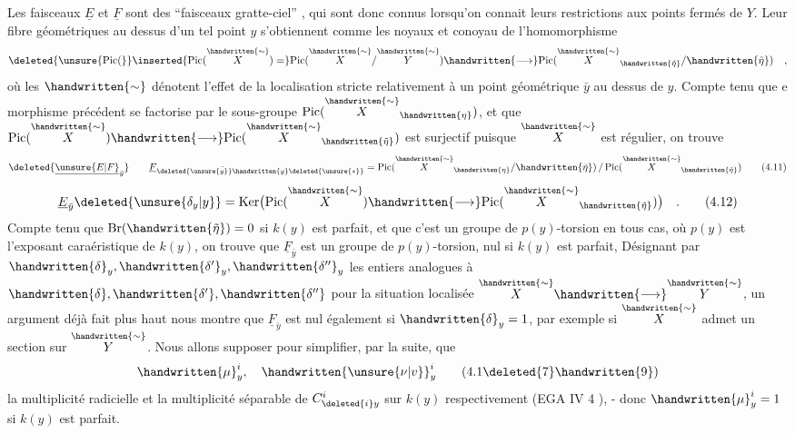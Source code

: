 Les faisceaux $\underline E$ et $\underline F$ sont des ``faisceaux gratte-ciel'' , qui sont donc connus lorsqu'on connait leurs restrictions aux points fermés de $Y$. Leur fibre géométriques au dessus d'un tel point $y$ s'obtiennent comme les noyaux et conoyau de l'homomorphisme
\[
  \deleted{\unsure{\mathrm{Pic}(}}\inserted{\mathrm{Pic}(\overset{\handwritten{\sim}}{X})=}
  \mathrm{Pic}(\overset{\handwritten{\sim}}{X}/\overset{\handwritten{\sim}}{Y})\handwritten{\longrightarrow}
  \mathrm{Pic}(\overset{\handwritten{\sim}}{X}_{\handwritten{\tilde\eta}}/\handwritten{\tilde\eta})\quad ,
\]
où les $\handwritten{\sim}$ dénotent l'effet de la localisation stricte relativement à un point géométrique $\bar y$ au dessus de $y$.  Compte tenu que e morphisme précédent se factorise par le sous-groupe $\mathrm{Pic}(\overset{\handwritten{\sim}}{X}_{\handwritten{\eta}})$, et que $\mathrm{Pic}(\overset{\handwritten{\sim}}{X})\handwritten{\longrightarrow}\mathrm{Pic}(\overset{\handwritten{\sim}}{X}_{\handwritten{\tilde\eta}})$ est surjectif puisque $\overset{\handwritten{\sim}}{X}$ est régulier, on trouve
\[
  \deleted{\underline{\unsure{E|F}}_{\bar y}}\qquad
  \underline F_{\bar{\deleted{\unsure{y}}\handwritten{y}}\deleted{\unsure{*}}}=
  \mathrm{Pic}(\overset{\handwritten{\sim}}{X}_{\handwritten{\eta}}/\handwritten{\tilde\eta})\,/\,\mathrm{Pic}(\overset{\handwritten{\sim}}{X}_{\handwritten{\tilde\eta}}) \tag*{(4.11)}
\]
\[
  \underline E_{\bar y}\deleted{\unsure{\delta_y|y}}=
  \operatorname{Ker}\bigl(\mathrm{Pic}(\overset{\handwritten{\sim}}{X})\handwritten{\longrightarrow}\mathrm{Pic}(\overset{\handwritten{\sim}}{X}_{\handwritten{\tilde\eta}})\bigr)\quad . \tag*{(4.12)}
\]
Compte tenu que $\mathrm{Br}(\handwritten{\tilde\eta})=0$ si $k(y)$ est parfait, et que c'est un groupe de $p(y)$-torsion en tous cas, où $p(y)$ est l'exposant caraéristique de $k(y)$, on trouve que $\underline F_{\bar y}$ est un groupe de $p(y)$-torsion, nul si $k(y)$ est parfait, Désignant par $\handwritten{\delta}_{y},\handwritten{\delta'}_{y},\handwritten{\delta''}_{y}$ les entiers analogues à $\handwritten{\delta},\handwritten{\delta'},\handwritten{\delta''}$ pour la situation localisée $\overset{\handwritten{\sim}}{X}\handwritten{\longrightarrow}\overset{\handwritten{\sim}}{Y}$, un argument déjà  fait plus haut nous montre que $\underline F_{\bar y}$  est nul également si $\handwritten{\delta}_{y}=1$, par exemple si $\overset{\handwritten{\sim}}{X}$ admet un section sur $\overset{\handwritten{\sim}}{Y}$. Nous allons supposer pour simplifier, par la suite, que
\clearpage
{}
\[
  \handwritten{\mu}^{i}_{y},\quad{\handwritten{\unsure{\nu|v}}}^{i}_{y}
  \tag*{(4.1\deleted{7}\handwritten{9})}
\]
la multiplicité radicielle et la multipli\makebox[0pt][l]{\raisebox{-.72em}[0pt][0pt]{\scriptsize\unsure{;|,}}}cité séparable de $C^{i}_{\deleted{i}y}$ sur $k(y)$ respectivement
\reversemarginpar{}\normalmarginpar
(EGA IV 4 ), - donc $\handwritten{\mu}^{i}_{y}=1$ si $k(y)$ est parfait.

